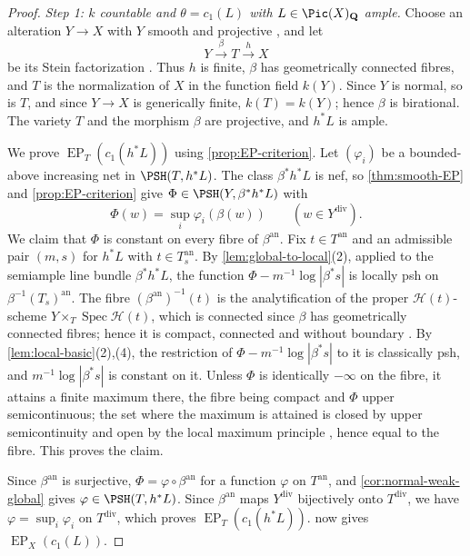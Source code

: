 \documentclass[11pt,a4paper]{article}
\newcommand{\an}{\mathrm{an}}          %
\newcommand{\divv}{\mathrm{div}}       %
\newcommand{\EP}{\operatorname{EP}}
\begin{document}
\begin{proof}
\emph{Step 1: $k$ countable and $\theta=c_1(L)$ with $L\in\Pic(X)_{\mathbf Q}$ ample.} Choose an alteration $Y\to X$ with $Y$ smooth and projective \cite[Theorem~4.1]{deJong}, and let
\[
Y\xrightarrow{\ \beta\ }T\xrightarrow{\ h\ }X
\]
be its Stein factorization \cite[\href{https://stacks.math.columbia.edu/tag/03H0}{Tag 03H0}]{Stacks}. Thus $h$ is finite, $\beta$ has geometrically connected fibres, and $T$ is the normalization of $X$ in the function field $k(Y)$. Since $Y$ is normal, so is $T$, and since $Y\to X$ is generically finite, $k(T)=k(Y)$; hence $\beta$ is birational. The variety $T$ and the morphism $\beta$ are projective, and $h^*L$ is ample.

We prove $\EP_T(c_1(h^*L))$ using \cref{prop:EP-criterion}. Let $(\varphi_i)$ be a bounded-above increasing net in $\PSH(T,h^*L)$. The class $\beta^*h^*L$ is nef, so \cref{thm:smooth-EP} and \cref{prop:EP-criterion} give $\Phi\in\PSH(Y,\beta^*h^*L)$ with
\[
\Phi(w)=\sup_i\varphi_i(\beta(w))\qquad(w\in Y^{\divv}).
\]
We claim that $\Phi$ is constant on every fibre of $\beta^{\an}$. Fix $t\in T^{\an}$ and an admissible pair $(m,s)$ for $h^*L$ with $t\in T_s^{\an}$. By \cref{lem:global-to-local}(2), applied to the semiample line bundle $\beta^*h^*L$, the function $\Phi-m^{-1}\log|\beta^*s|$ is locally psh on $\beta^{-1}(T_s)^{\an}$. The fibre $(\beta^{\an})^{-1}(t)$ is the analytification of the proper $\mathcal H(t)$-scheme $Y\times_T\operatorname{Spec}\mathcal H(t)$, which is connected since $\beta$ has geometrically connected fibres; hence it is compact, connected and without boundary \cite[\S3.4--3.5]{Berkovich90}. By \cref{lem:local-basic}(2),(4), the restriction of $\Phi-m^{-1}\log|\beta^*s|$ to it is classically psh, and $m^{-1}\log|\beta^*s|$ is constant on it. Unless $\Phi$ is identically $-\infty$ on the fibre, it attains a finite maximum there, the fibre being compact and $\Phi$ upper semicontinuous; the set where the maximum is attained is closed by upper semicontinuity and open by the local maximum principle \cite[Theorem~6.1]{GublerRabinoff25}, hence equal to the fibre. This proves the claim.

Since $\beta^{\an}$ is surjective, $\Phi=\varphi\circ\beta^{\an}$ for a function $\varphi$ on $T^{\an}$, and \cref{cor:normal-weak-global} gives $\varphi\in\PSH(T,h^*L)$. Since $\beta^{\an}$ maps $Y^{\divv}$ bijectively onto $T^{\divv}$, we have $\varphi=\sup_i\varphi_i$ on $T^{\divv}$, which proves $\EP_T(c_1(h^*L))$.  now gives $\EP_X(c_1(L))$.


\end{proof}
\end{document}
